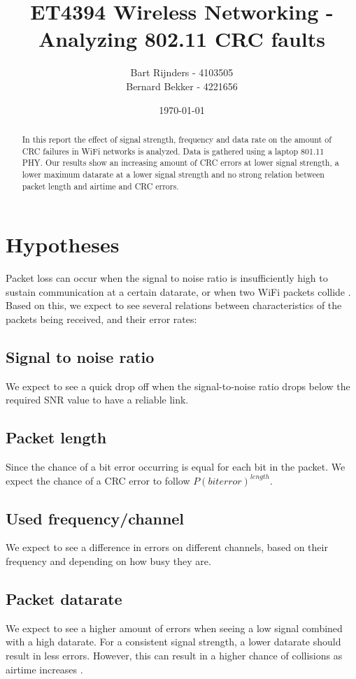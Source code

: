 \documentclass{IEEEtran}
\title{ET4394 Wireless Networking - Analyzing 802.11 CRC faults}
\date{\today}
\author{
Bart Rijnders - 4103505 \\
Bernard Bekker - 4221656 
}
\begin{document}
\maketitle

\begin{abstract}

In this report the effect of signal strength, frequency and data rate on the amount of CRC failures in WiFi networks is analyzed. Data is gathered using a laptop 801.11 PHY. Our results show an increasing amount of CRC errors at lower signal strength, a lower maximum datarate at a lower signal strength and no strong relation between packet length and airtime and CRC errors. 
\end{abstract}

\section{Hypotheses}

Packet loss can occur when the signal to noise ratio is insufficiently high to sustain communication at a certain datarate, or when two WiFi packets collide \cite{4509719}. Based on this, we expect to see several relations between characteristics of the packets being received, and their error rates:

\subsection{Signal to noise ratio}
We expect to see a quick drop off when the signal-to-noise ratio drops below the required SNR value to have a reliable link.

\subsection{Packet length}
Since the chance of a bit error occurring is equal for each bit in the packet. We expect the chance of a CRC error to follow $P(biterror)^{length}$. 

\subsection{Used frequency/channel}
We expect to see a difference in errors on different channels, based on their frequency and depending on how busy they are.

\subsection{Packet datarate}
We expect to see a higher amount of errors when seeing a low signal combined with a high datarate. For a consistent signal strength, a lower datarate should result in less errors. However, this can result in a higher chance of collisions as airtime increases \cite{4215626}. 
\end{document}
